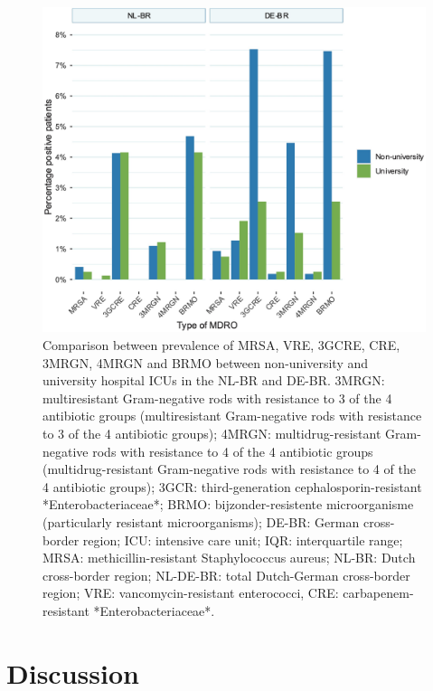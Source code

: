 \documentclass[
]{book}
\begin{document}
\begin{figure}

{\centering \includegraphics[width=1\linewidth]{images/10-04} 

}

\caption{Comparison between prevalence of MRSA, VRE, 3GCRE, CRE, 3MRGN, 4MRGN and BRMO between non-university and university hospital ICUs in the NL-BR and DE-BR. 3MRGN: multiresistant Gram-negative rods with resistance to 3 of the 4 antibiotic groups (multiresistant Gram-negative rods with resistance to 3 of the 4 antibiotic groups); 4MRGN: multidrug-resistant Gram-negative rods with resistance to 4 of the 4 antibiotic groups (multidrug-resistant Gram-negative rods with resistance to 4 of the 4 antibiotic groups); 3GCR: third-generation cephalosporin-resistant *Enterobacteriaceae*; BRMO: bijzonder-resistente microorganisme (particularly resistant microorganisms); DE-BR: German cross-border region; ICU: intensive care unit; IQR: interquartile range; MRSA: methicillin-resistant Staphylococcus aureus; NL-BR: Dutch cross-border region; NL-DE-BR: total Dutch-German cross-border region; VRE: vancomycin-resistant enterococci, CRE: carbapenem-resistant *Enterobacteriaceae*.}\label{fig:fig10-4}
\end{figure}

\hypertarget{discussion-6}{%
\section{Discussion}\label{discussion-6}}
\end{document}
